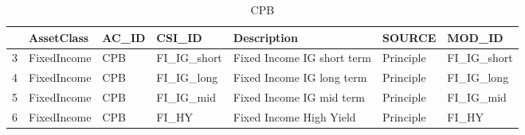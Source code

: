 \begin{longtable}{rllllll}
\caption{CPB} \\ 
  \hline
 & AssetClass & AC\_ID & CSI\_ID & Description & SOURCE & MOD\_ID \\ 
  \hline
3 & FixedIncome & CPB & FI\_IG\_short & Fixed Income IG short term & Principle & FI\_IG\_short \\ 
  4 & FixedIncome & CPB & FI\_IG\_long & Fixed Income IG long term & Principle & FI\_IG\_long \\ 
  5 & FixedIncome & CPB & FI\_IG\_mid & Fixed Income IG mid term & Principle & FI\_IG\_mid \\ 
  6 & FixedIncome & CPB & FI\_HY & Fixed Income High Yield & Principle & FI\_HY \\ 
   \hline
\hline
\end{longtable}
